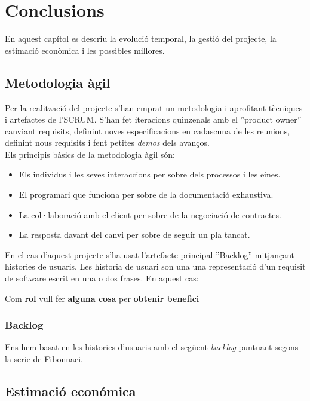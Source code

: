 \chapter{Conclusions}
\label{cha:conclussions}

En aquest cap\'{i}tol es descriu la evolució temporal, la gestió del projecte, la estimació econòmica i les possibles millores.


\section{Metodologia àgil}
Per la realització del projecte s'han emprat un metodologia  i aprofitant tècniques i artefactes de l'SCRUM.\cite{agile} S'han fet iteracions quinzenals amb el ''product owner'' canviant requisits, definint noves especificacions en cadascuna de les reunions, definint nous requisits i fent petites \textit{demos} dels avanços.\\
Els principis bàsics de la metodologia àgil són\cite{agilemanifesto}:
\begin{itemize}
\item Els individus i les seves interaccions per sobre dels processos i les eines.
\item El programari que funciona per sobre de la documentació exhaustiva.
\item La col·laboració amb el client per sobre de la negociació de contractes.
\item La resposta davant del canvi per sobre de seguir un pla tancat.
\end{itemize}

En el cas d'aquest projecte s'ha usat l'artefacte principal ''Backlog'' mitjançant histories de usuaris. Les historia de usuari son una una representació d'un requisit de software escrit en una o dos frases. En aquest cas:\\
\centerline{Com \textbf{rol} vull fer \textbf{alguna cosa} per \textbf{obtenir benefici}}

\subsection{Backlog}
Ens hem basat en les histories d'usuaris amb el següent \textit{backlog} puntuant segons la serie de Fibonnaci.\cite{backlogfibonnacci}

\section{Estimaci\'{o} econ\'{o}mica}


